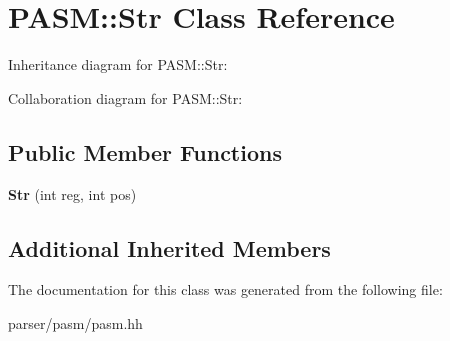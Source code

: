 \hypertarget{classPASM_1_1Str}{}\section{P\+A\+SM\+:\+:Str Class Reference}
\label{classPASM_1_1Str}


Inheritance diagram for P\+A\+SM\+:\+:Str\+:


Collaboration diagram for P\+A\+SM\+:\+:Str\+:
\subsection*{Public Member Functions}
\begin{DoxyCompactItemize}
\item 
\mbox{\label{classPASM_1_1Str_a3920c782be2ef53f321dbfb788e993f9}} 
{\bfseries Str} (int reg, int pos)
\end{DoxyCompactItemize}
\subsection*{Additional Inherited Members}


The documentation for this class was generated from the following file\+:\begin{DoxyCompactItemize}
\item 
parser/pasm/pasm.\+hh\end{DoxyCompactItemize}
